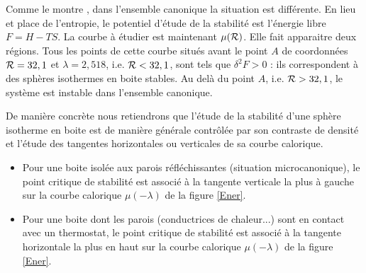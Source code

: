 	Comme le montre \cite{2002A&A...381..340C}, dans l'ensemble canonique la situation est différente. En lieu et
	place de l'entropie, le potentiel d'étude de la stabilité est l'énergie libre $F=H-TS$. La courbe à étudier est
	maintenant $\mu(\mathcal{R})$. Elle fait apparaitre deux régions. Tous les points de cette courbe situés avant le point
	$A$ de coordonnées $\mathcal{R}=32,1$ et $\lambda=2,518$, i.e. $\mathcal{R}<32,1$, sont tels que $\delta^2 F>0$ : ils
	correspondent à des sphères isothermes en boite stables. Au delà du point $A$, i.e. $\mathcal{R}>32,1$, le système est
	instable dans l'ensemble canonique.
	
	De manière concrète nous retiendrons que l'étude de la stabilité d'une sphère isotherme en boite est de manière générale contrôlée par son contraste de densité et l'étude des tangentes horizontales ou verticales de sa courbe calorique.   
	\begin{itemize}

		\item Pour une boite isolée aux parois réfléchissantes (situation microcanonique), le point critique de
			stabilité est associé à la tangente verticale la plus à gauche sur la courbe calorique
			$\mu(-\lambda)$ de la figure \ref{Ener}.

		\item Pour une boite dont les parois (conductrices de chaleur...) sont en contact avec un thermostat, le
			point critique de stabilité est associé à la tangente horizontale la plus en haut sur la courbe
			calorique $\mu(-\lambda)$ de la figure \ref{Ener}.

	\end{itemize}
	
